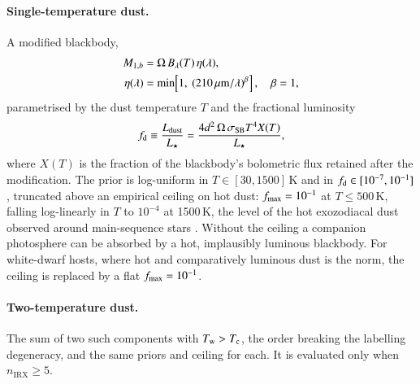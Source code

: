 \documentclass{aa}
\newcommand{\nirx}{n_{\mathrm{IRX}}}
\begin{document}
\paragraph{Single-temperature dust.} A modified blackbody,
\begin{equation}
  \begin{aligned}
  M_{1,b} &= \Omega\, B_\lambda(T)\,\eta(\lambda), \\
  \eta(\lambda) &= \min\!\left[1,\ (210\,\mu{\rm m}/\lambda)^{\beta}\right],
  \quad \beta = 1 ,
  \end{aligned}
\end{equation}
parametrised by the dust temperature $T$ and the fractional luminosity
\begin{equation}
  f_{\rm d} \equiv \frac{L_{\rm dust}}{L_\star}
  = \frac{4 d^2\, \Omega\, \sigma_{\rm SB} T^4 X(T)}{L_\star},
\end{equation}
where $X(T)$ is the fraction of the blackbody's bolometric flux retained after
the modification. The prior is log-uniform in $T \in [30, 1500]$\,K and in
$f_{\rm d} \in [10^{-7}, 10^{-1}]$, truncated above an empirical ceiling on hot
dust: $f_{\rm max} = 10^{-1}$ at $T \le 500$\,K, falling log-linearly in $T$ to
$10^{-4}$ at 1500\,K, the level of the hot exozodiacal dust observed around
main-sequence stars \citep{kral2017}. Without the ceiling a companion photosphere
can be absorbed by a hot, implausibly luminous blackbody. For white-dwarf hosts,
where hot and comparatively luminous dust is the norm, the ceiling is replaced by
a flat $f_{\rm max} = 10^{-1}$.

\paragraph{Two-temperature dust.} The sum of two such components with
$T_{\rm w} > T_{\rm c}$, the order breaking the labelling degeneracy, and the same
priors and ceiling for each. It is evaluated only when $\nirx \ge 5$.
\end{document}
